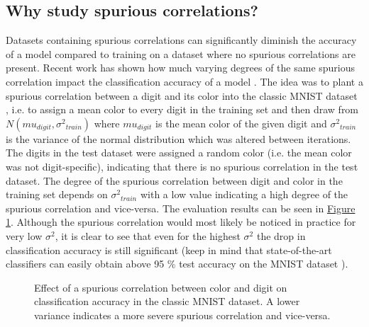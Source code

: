 \documentclass{article}
\begin{document}
\subsection{Why study spurious correlations?}
\label{sec:motivation}
Datasets containing spurious correlations can significantly diminish the accuracy of a model compared to training on a dataset
where no spurious correlations are present. Recent work has shown how much varying degrees of the same spurious correlation
impact the classification accuracy of a model \cite{Kim_2019_CVPR}. The idea was to plant a spurious correlation between a digit and its
color into the classic MNIST dataset \cite{mnist_web}, i.e. to assign a mean color to every digit in the training set and
then draw from $N(mu_{digit},{\sigma^2}_{train})$ where $mu_{digit}$ is the mean color of the given digit and
${\sigma^2}_{train}$ is the variance of the normal distribution which was altered between iterations.
The digits in the test dataset were assigned a random color (i.e. the mean color was not digit-specific), indicating that there
is no spurious correlation in the test dataset. The degree of the spurious correlation between digit and color in the training
set depends on ${\sigma^2}_{train}$ with a low value indicating a high degree of the spurious correlation and vice-versa.
The evaluation results can be seen in  \hyperref[fig:mnistGraph]{Figure 1}. Although the spurious correlation would most likely
be noticed in practice for very low $\sigma^2$, it is clear to see that even for the highest $\sigma^2$ the drop in
classification accuracy is still significant (keep in mind that state-of-the-art classifiers can easily obtain above
95 \% test accuracy on the MNIST dataset \cite{mnist_web}).

\begin{figure}
    \centering
    \caption{Effect of a spurious correlation between color and digit on classification accuracy
    in the classic MNIST dataset. A lower variance indicates a more severe spurious correlation and vice-versa.}
    \label{fig:mnistGraph}
\end{figure}
\end{document}
